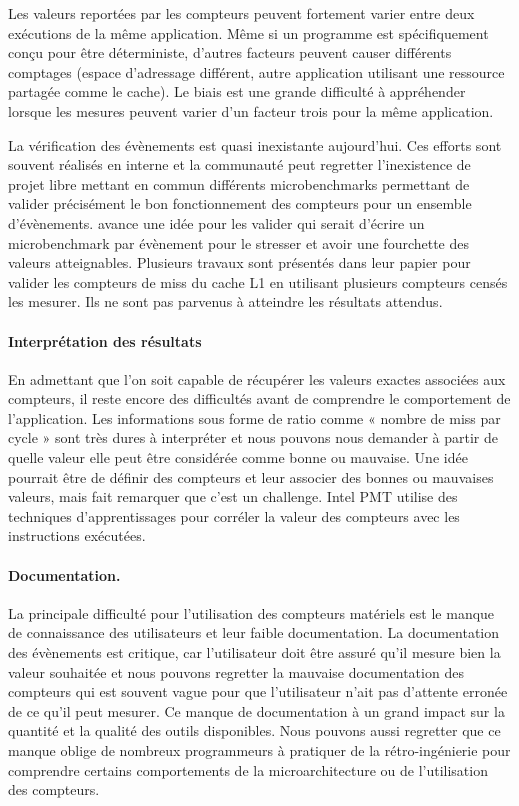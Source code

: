         Les valeurs reportées par les compteurs peuvent fortement varier entre deux exécutions de la même application. Même si un programme est spécifiquement conçu pour être déterministe, d'autres facteurs peuvent causer différents comptages (espace d'adressage différent, autre application utilisant une ressource partagée comme le cache). Le biais est une grande difficulté à appréhender lorsque les mesures peuvent varier d'un facteur trois pour la même application.
            
        La vérification des évènements est quasi inexistante aujourd'hui. Ces efforts sont souvent réalisés en interne et la communauté \cite{Moseley2011} peut regretter l'inexistence de projet libre mettant en commun différents microbenchmarks permettant de valider précisément le bon fonctionnement des compteurs pour un ensemble d'évènements. \cite{Moseley2011} avance une idée pour les valider qui serait d'écrire un microbenchmark par évènement pour le stresser et avoir une fourchette des valeurs atteignables. Plusieurs travaux sont présentés dans leur papier pour valider les compteurs de miss du cache L1 en utilisant plusieurs compteurs censés les mesurer. Ils ne sont pas parvenus à atteindre les résultats attendus.
    
    \paragraph{Interprétation des résultats}
    
        En admettant que l'on soit capable de récupérer les valeurs exactes associées aux compteurs, il reste encore des difficultés avant de comprendre le comportement de l'application. Les informations sous forme de ratio comme « nombre de miss par cycle » sont très dures à interpréter et nous pouvons nous demander à partir de quelle valeur elle peut être considérée comme bonne ou mauvaise. Une idée pourrait être de définir des compteurs et leur associer des bonnes ou mauvaises valeurs, mais \cite{Moseley2011} fait remarquer que c'est un challenge. Intel PMT \cite{RobertD.2011} utilise des techniques d'apprentissages pour corréler la valeur des compteurs avec les instructions exécutées.

    \paragraph{Documentation.}
        
        La principale difficulté pour l'utilisation des compteurs matériels est le manque de connaissance des utilisateurs et leur faible documentation. La documentation des évènements est critique, car l'utilisateur doit être assuré qu'il mesure bien la valeur souhaitée et nous pouvons regretter la mauvaise documentation des compteurs qui est souvent vague pour que l'utilisateur n'ait pas d'attente erronée de ce qu'il peut mesurer. Ce manque de documentation à un grand impact sur la quantité et la qualité des outils disponibles. Nous pouvons aussi regretter que ce manque oblige de nombreux programmeurs à pratiquer de la rétro-ingénierie pour comprendre certains comportements de la microarchitecture ou de l'utilisation des compteurs.

